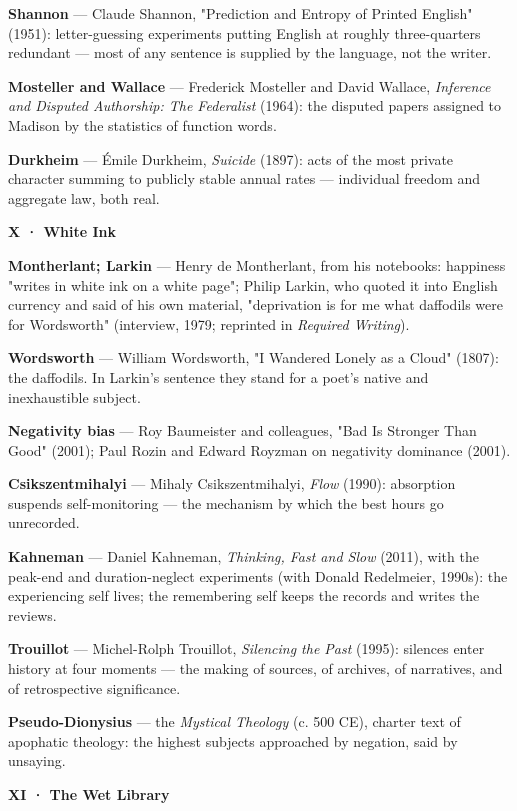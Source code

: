 \documentclass[11pt]{article}
\begin{document}
\textbf{Shannon} — Claude Shannon, "Prediction and Entropy of Printed English" (1951): letter-guessing experiments putting English at roughly three-quarters redundant — most of any sentence is supplied by the language, not the writer.

\textbf{Mosteller and Wallace} — Frederick Mosteller and David Wallace, \emph{Inference and Disputed Authorship: The Federalist} (1964): the disputed papers assigned to Madison by the statistics of function words.

\textbf{Durkheim} — Émile Durkheim, \emph{Suicide} (1897): acts of the most private character summing to publicly stable annual rates — individual freedom and aggregate law, both real.

\textbf{X · White Ink}

\textbf{Montherlant; Larkin} — Henry de Montherlant, from his notebooks: happiness "writes in white ink on a white page"; Philip Larkin, who quoted it into English currency and said of his own material, "deprivation is for me what daffodils were for Wordsworth" (interview, 1979; reprinted in \emph{Required Writing}).

\textbf{Wordsworth} — William Wordsworth, "I Wandered Lonely as a Cloud" (1807): the daffodils. In Larkin's sentence they stand for a poet's native and inexhaustible subject.

\textbf{Negativity bias} — Roy Baumeister and colleagues, "Bad Is Stronger Than Good" (2001); Paul Rozin and Edward Royzman on negativity dominance (2001).

\textbf{Csikszentmihalyi} — Mihaly Csikszentmihalyi, \emph{Flow} (1990): absorption suspends self-monitoring — the mechanism by which the best hours go unrecorded.

\textbf{Kahneman} — Daniel Kahneman, \emph{Thinking, Fast and Slow} (2011), with the peak-end and duration-neglect experiments (with Donald Redelmeier, 1990s): the experiencing self lives; the remembering self keeps the records and writes the reviews.

\textbf{Trouillot} — Michel-Rolph Trouillot, \emph{Silencing the Past} (1995): silences enter history at four moments — the making of sources, of archives, of narratives, and of retrospective significance.

\textbf{Pseudo-Dionysius} — the \emph{Mystical Theology} (c. 500 CE), charter text of apophatic theology: the highest subjects approached by negation, said by unsaying.

\textbf{XI · The Wet Library}
\end{document}
